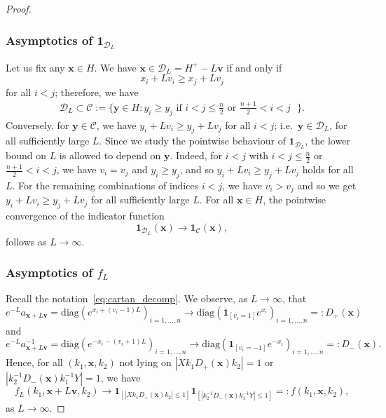 \documentclass[10pt,a4paper]{amsart}
\newcommand{\x}{\mathbf{x}}
\newcommand{\y}{\mathbf{y}}
\begin{document}
\begin{proof}
\subsubsection*{Asymptotics of $\mathbf{1}_{\mathcal{D}_L}$}
    Let us fix any $\mathbf{x} \in H$. We have $\mathbf{x} \in \mathcal{D}_L = H^{+}-L\mathbf{v}$ if and only if 
    \[
        x_i + L v_i
        \ge 
        x_j + L v_j
    \]
    for all $i < j$; therefore, we have
    \begin{align}\label{eq:domoconDL}
        \mathcal{D}_L  \subset \mathcal{C}  :=
    \{
    \mathbf{y} \in H: y_i \ge y_j \text{ if $i < j \le \tfrac{n}{2}$ or $\tfrac{n+1}{2} < i <j$ } \}.
    \end{align}
     Conversely, for $\y \in \mathcal{C}$, we have $y_i + Lv_i \ge y_j + L v_j$ for all $i<j$;
      i.e.\ $\y \in \mathcal{D}_{L}$, 
     for all sufficiently large $L$. Since we study the pointwise behaviour of $\mathbf{1}_{\mathcal{D}_{L}}$, the lower bound on $L$ is allowed to depend on $\y$. 
     Indeed, for $i<j$ with $i < j \le \tfrac{n}{2}$ or $\tfrac{n+1}{2} < i <j$, we have $v_i = v_j$ and $y_i \ge y_j$, and so
      $y_i + L v_i \ge y_j + Lv_j$ holds for all $L$. For the remaining combinations of indices $i<j$, we have  $v_i > v_j$ and so we get $y_i + L v_i \ge y_j + Lv_j$  for all sufficiently large $L$.
    For all $\mathbf{x} \in H$, 
     the pointwise convergence of the indicator function
    \[
    \mathbf{1}_{\mathcal{D}_L}(\x) \to \mathbf{1}_{\mathcal{C}}(\x), 
    \]
    follows as $L \to \infty$.

\subsubsection*{Asymptotics of $f_L$} Recall the notation~\eqref{eq:cartan_decomp}. 
   We observe, as $L \to \infty$, that 
      \begin{equation}\label{eq:defofD+}
          e^{-L} a_{\mathbf{x}+L\mathbf{v}} = \mathrm{diag}(
      e^{x_i + (v_i - 1)L }
      )_{i=1,\ldots,n} \to \mathrm{diag}
      (
      \mathbf{1}_{[v_i=1]} e^{x_i  }
      )_{i=1,\ldots,n} =: D_+(\mathbf{x}) 
      \end{equation}
      and
        \begin{equation}\label{eq:defofD-}
      e^{-L} a_{\mathbf{x}+L\mathbf{v}}^{-1} = \mathrm{diag}(
      e^{-x_i - (v_i + 1)L }
      )_{i=1,\ldots,n} \to \mathrm{diag}
      (
      \mathbf{1}_{[v_i=-1]} e^{-x_i  }
      )_{i=1,\ldots,n} =: D_{-}(\mathbf{x}).
        \end{equation}
      Hence, for all $(k_1,\mathbf{x},k_2)$ not lying on $| X k_1 D_+(\mathbf{x}) k_2|=1$ or $|  k_2^{-1} D_-(\mathbf{x}) k_1^{-1} Y |=1$, we have  
     \begin{equation}
     \label{eq:f(k_1,x,k_2)}
       f_L(k_1,\mathbf{x}+L\mathbf{v},k_2) 
       \to \mathbf{1}_{[| X k_1 D_+(\mathbf{x}) k_2|\le 1]} 
        \mathbf{1}_{[|  k_2^{-1} D_-(\mathbf{x}) k_1^{-1} Y |\le 1]} =: f(k_1,\mathbf{x},k_2) ,
    \end{equation}
      as $L \to \infty$.
      

\end{proof}
\end{document}

